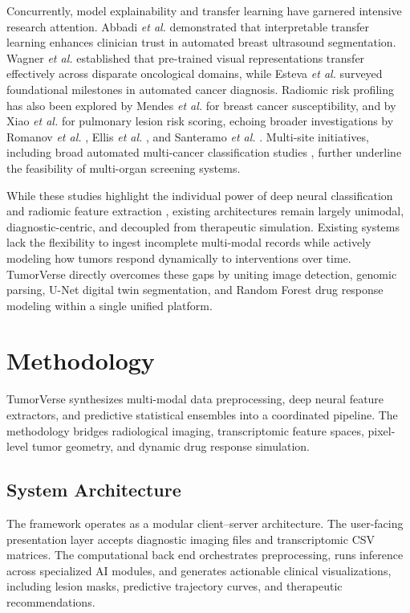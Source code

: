 \documentclass[conference]{IEEEtran}
\begin{document}
Concurrently, model explainability and transfer learning have garnered intensive research attention. Abbadi \textit{et al.} \cite{abbadi2025} demonstrated that interpretable transfer learning enhances clinician trust in automated breast ultrasound segmentation. Wagner \textit{et al.} \cite{wagner2024} established that pre-trained visual representations transfer effectively across disparate oncological domains, while Esteva \textit{et al.} \cite{esteva2024} surveyed foundational milestones in automated cancer diagnosis. Radiomic risk profiling has also been explored by Mendes \textit{et al.} \cite{mendes2025} for breast cancer susceptibility, and by Xiao \textit{et al.} \cite{xiao2025} for pulmonary lesion risk scoring, echoing broader investigations by Romanov \textit{et al.} \cite{romanov2024}, Ellis \textit{et al.} \cite{ellis2024}, and Santeramo \textit{et al.} \cite{santeramo2024}. Multi-site initiatives, including broad automated multi-cancer classification studies \cite{autocancer2024, iitindore2026}, further underline the feasibility of multi-organ screening systems.

While these studies highlight the individual power of deep neural classification and radiomic feature extraction \cite{yao2025, wang2025, mendes2025}, existing architectures remain largely unimodal, diagnostic-centric, and decoupled from therapeutic simulation. Existing systems lack the flexibility to ingest incomplete multi-modal records while actively modeling how tumors respond dynamically to interventions over time. TumorVerse directly overcomes these gaps by uniting image detection, genomic parsing, U-Net digital twin segmentation, and Random Forest drug response modeling within a single unified platform.

\section{Methodology}
TumorVerse synthesizes multi-modal data preprocessing, deep neural feature extractors, and predictive statistical ensembles into a coordinated pipeline. The methodology bridges radiological imaging, transcriptomic feature spaces, pixel-level tumor geometry, and dynamic drug response simulation.

\subsection{System Architecture}
The framework operates as a modular client--server architecture. The user-facing presentation layer accepts diagnostic imaging files and transcriptomic CSV matrices. The computational back end orchestrates preprocessing, runs inference across specialized AI modules, and generates actionable clinical visualizations, including lesion masks, predictive trajectory curves, and therapeutic recommendations.
\end{document}
